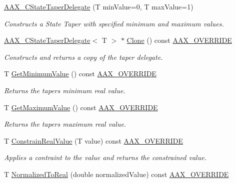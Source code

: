 \begin{DoxyCompactItemize}
\item 
\mbox{\hyperlink{a01569_a99bdadedcd4de8f8f7a88536a6c262d2}{A\+A\+X\+\_\+\+C\+State\+Taper\+Delegate}} (T min\+Value=0, T max\+Value=1)
\begin{DoxyCompactList}\small\item\em Constructs a State Taper with specified minimum and maximum values. \end{DoxyCompactList}\item 
\mbox{\hyperlink{a01569}{A\+A\+X\+\_\+\+C\+State\+Taper\+Delegate}}$<$ T $>$ $\ast$ \mbox{\hyperlink{a01569_a4a7f0c8d7a59a348d128a0bf750fea29}{Clone}} () const \mbox{\hyperlink{a00392_ac2f24a5172689ae684344abdcce55463}{A\+A\+X\+\_\+\+O\+V\+E\+R\+R\+I\+DE}}
\begin{DoxyCompactList}\small\item\em Constructs and returns a copy of the taper delegate. \end{DoxyCompactList}\item 
T \mbox{\hyperlink{a01569_a4638babda379cc5bbf215f63c3f0bb08}{Get\+Minimum\+Value}} () const \mbox{\hyperlink{a00392_ac2f24a5172689ae684344abdcce55463}{A\+A\+X\+\_\+\+O\+V\+E\+R\+R\+I\+DE}}
\begin{DoxyCompactList}\small\item\em Returns the taper\textquotesingle{}s minimum real value. \end{DoxyCompactList}\item 
T \mbox{\hyperlink{a01569_aeb4ff10c4750236caa03be5f04c9eaba}{Get\+Maximum\+Value}} () const \mbox{\hyperlink{a00392_ac2f24a5172689ae684344abdcce55463}{A\+A\+X\+\_\+\+O\+V\+E\+R\+R\+I\+DE}}
\begin{DoxyCompactList}\small\item\em Returns the taper\textquotesingle{}s maximum real value. \end{DoxyCompactList}\item 
T \mbox{\hyperlink{a01569_a6caec4112e24a711c9b7fdefa6384462}{Constrain\+Real\+Value}} (T value) const \mbox{\hyperlink{a00392_ac2f24a5172689ae684344abdcce55463}{A\+A\+X\+\_\+\+O\+V\+E\+R\+R\+I\+DE}}
\begin{DoxyCompactList}\small\item\em Applies a contraint to the value and returns the constrained value. \end{DoxyCompactList}\item 
T \mbox{\hyperlink{a01569_a2a067bafa1822b1cf19816c64ce5e2d3}{Normalized\+To\+Real}} (double normalized\+Value) const \mbox{\hyperlink{a00392_ac2f24a5172689ae684344abdcce55463}{A\+A\+X\+\_\+\+O\+V\+E\+R\+R\+I\+DE}}

\end{DoxyCompactItemize}
